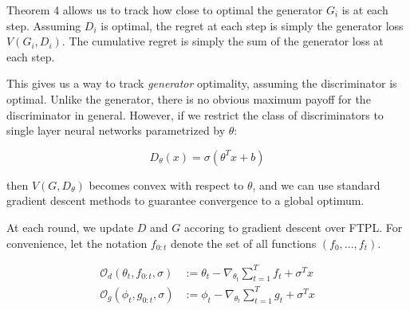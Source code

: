 \documentclass[]{article}
\theoremstyle{definition}
\begin{document}
Theorem 4 allows us to track how close to optimal the generator $G_i$ is at each step. Assuming $D_i$ is optimal, the regret at each step is simply the generator loss $V(G_i, D_i)$. The cumulative regret is simply the sum of the generator loss at each step. 

This gives us a way to track \emph{generator} optimality, assuming the discriminator is optimal. Unlike the generator, there is no obvious maximum payoff for the discriminator in general. 
However, if we restrict the class of discriminators to single layer neural networks parametrized by $\theta$:

\begin{equation}
    D_\theta(x) = \sigma(\theta^Tx + b) 
\end{equation}

then $V(G, D_\theta)$ becomes convex with respect to $\theta$, and we can use standard gradient descent methods to guarantee convergence to a global optimum. 

At each round, we update $D$ and $G$ accoring to gradient descent over FTPL. For convenience, let the notation $f_{0:t}$ denote the set of all functions $(f_0,...,f_t)$.

\begin{align}
     \mathcal{O}_d(\theta_t, f_{0:t}, \sigma) &:= \theta_t - \nabla_{\theta_t} \sum_{t=1}^T f_t + \sigma^Tx \\
 \mathcal{O}_g(\phi_t, g_{0:t}, \sigma) &:= \phi_t - \nabla_{\theta_t} \sum_{t=1}^T g_t + \sigma^Tx 
\end{align}
\end{document}
